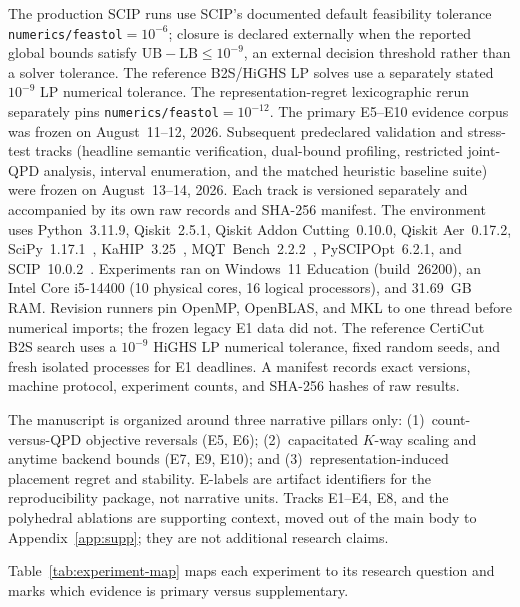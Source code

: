 \documentclass[11pt]{article}
\newcommand{\CertiCut}{CertiCut}
\newcommand{\CertiCut}{\textsc{CertiCut}}
\newcommand{\LB}{\mathrm{LB}}
\newcommand{\UB}{\mathrm{UB}}
\begin{document}
The production SCIP runs use SCIP's documented default feasibility tolerance \texttt{numerics/feastol}$=10^{-6}$; closure is declared externally when the reported global bounds satisfy $\UB-\LB\le10^{-9}$, an external decision threshold rather than a solver tolerance. The reference B2S/HiGHS LP solves use a separately stated $10^{-9}$ LP numerical tolerance. The representation-regret lexicographic rerun separately pins \texttt{numerics/feastol}$=10^{-12}$. The primary E5--E10 evidence corpus was frozen on August~11--12, 2026. Subsequent predeclared validation and stress-test tracks (headline semantic verification, dual-bound profiling, restricted joint-QPD analysis, interval enumeration, and the matched heuristic baseline suite) were frozen on August~13--14, 2026. Each track is versioned separately and accompanied by its own raw records and SHA-256 manifest. The environment uses Python~3.11.9, Qiskit~2.5.1, Qiskit Addon Cutting~0.10.0, Qiskit Aer~0.17.2, SciPy~1.17.1~\cite{scipy}, KaHIP~3.25~\cite{kahip}, MQT~Bench~2.2.2~\cite{mqtbench}, PySCIPOpt~6.2.1, and SCIP~10.0.2~\cite{scip}. Experiments ran on Windows~11 Education (build~26200), an Intel Core i5-14400 (10 physical cores, 16 logical processors), and 31.69~GB RAM. Revision runners pin OpenMP, OpenBLAS, and MKL to one thread before numerical imports; the frozen legacy E1 data did not. The reference \CertiCut{} B2S search uses a $10^{-9}$ HiGHS LP numerical tolerance, fixed random seeds, and fresh isolated processes for E1 deadlines. A manifest records exact versions, machine protocol, experiment counts, and SHA-256 hashes of raw results.

The manuscript is organized around three narrative pillars only: (1)~count-versus-QPD objective reversals (E5, E6); (2)~capacitated $K$-way scaling and anytime backend bounds (E7, E9, E10); and (3)~representation-induced placement regret and stability. E-labels are artifact identifiers for the reproducibility package, not narrative units. Tracks E1--E4, E8, and the polyhedral ablations are supporting context, moved out of the main body to Appendix~\ref{app:supp}; they are not additional research claims.

Table~\ref{tab:experiment-map} maps each experiment to its research question and marks which evidence is primary versus supplementary.
\end{document}
